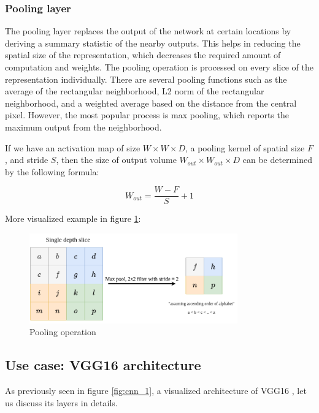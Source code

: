 \subsubsection{Pooling layer}
The pooling layer replaces the output of the network at certain locations by deriving a summary statistic of the nearby outputs. This helps in reducing the spatial size of the representation, which decreases the required amount of computation and weights. The pooling operation is processed on every slice of the representation individually.
There are several pooling functions such as the average of the rectangular neighborhood, L2 norm of the rectangular neighborhood, and a weighted average based on the distance from the central pixel. However, the most popular process is max pooling, which reports the maximum output from the neighborhood.

If we have an activation map of size $W \times W \times D$, a pooling kernel of spatial size $F$, and stride $S$, then the size of output volume $W_{out} \times W_{out} \times D$ can be determined by the following formula:

\begin{equation} \label{eq:Formula for Pooling Layer}
    W_{out} = \frac{W - F}{S} + 1
\end{equation}

More visualized example in figure \ref{fig:cnn_3}:

\begin{figure}[h!]
    \centering
    \includegraphics[width=0.8\textwidth]{images/cnn_3.png}
    \caption{Pooling operation}
    \label{fig:cnn_3}
\end{figure}

\subsection{Use case: VGG16 architecture}
As previously seen in figure \ref{fig:cnn_1}, a visualized architecture of VGG16 \cite{vgg}, let us discuss its layers in details.

